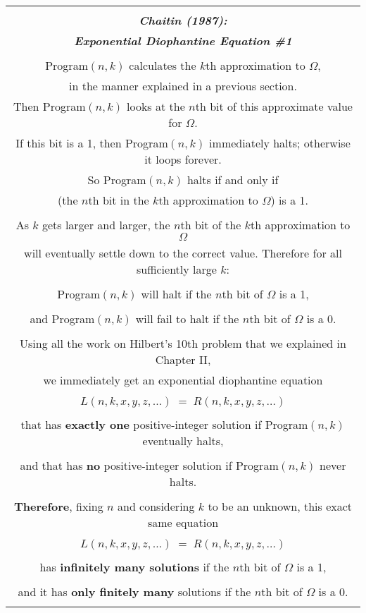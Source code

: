 \documentclass[12pt]{book}
\begin{document}
{\footnotesize
\begin{center}
\begin{tabular}{|c|}
\hline
\\
\textbf{\large \emph{Chaitin (1987):}}
\\
\textbf{\large \emph{Exponential Diophantine Equation \#1}}
\\ \\
Program$(n,k)$ calculates the $k$th approximation to $\Omega$, 
\\
in the manner explained in a previous section.
\\
Then Program$(n,k)$ looks at the $n$th bit of this approximate value for $\Omega$.
\\
If this bit is a 1, then Program$(n,k)$ immediately halts; otherwise it loops forever.
\\
So Program$(n,k)$ halts if and only if 
\\
(the $n$th bit in the $k$th approximation to $\Omega$) is a 1.
\\ \\
As $k$ gets larger and larger, 
the $n$th bit of the $k$th approximation to $\Omega$
\\
will eventually settle down to
the correct value.
Therefore for all sufficiently large $k$:
\\ \\
Program$(n,k)$ will halt if the $n$th bit of $\Omega$ is a 1,
\\ \\
and Program$(n,k)$ will fail to halt if the $n$th bit of $\Omega$ is a 0.
\\ \\
Using all the work on Hilbert's 10th problem that we explained in Chapter II, 
\\
we immediately get an exponential diophantine equation
\\ \\
$L(n, k, x, y, z, \ldots) \; = \; R(n, k, x, y, z, \ldots)$
\\ \\
that has \textbf{exactly one} positive-integer solution
if Program$(n,k)$ eventually halts,  
\\ \\
and that has \textbf{no} positive-integer solution if Program$(n,k)$ never halts.
\\ \\
\textbf{Therefore}, fixing $n$ and considering $k$ to be an unknown, this exact same equation
\\ \\
$L(n, k, x, y, z, \ldots) \; = \; R(n, k, x, y, z, \ldots)$
\\ \\
has \textbf{infinitely many solutions}
if the $n$th bit of $\Omega$ is a 1,  
\\ \\
and it has \textbf{only finitely many} solutions
if the $n$th bit of $\Omega$ is a 0.
\\
\\
\hline
\end{tabular}
\end{center}
}
\end{document}
